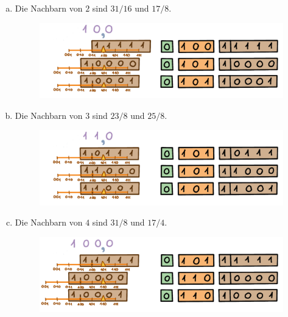 \begin{enumerate}[(a)]
\item Die Nachbarn von \(2\) sind \(31/16\) und \(17/8\).
\begin{figure}[H]
\centering
\includegraphics[width=\linewidth]{Pictures/Nachbarn2.png}
\end{figure}

\item Die Nachbarn von \(3\) sind \(23/8\) und \(25/8\).
\begin{figure}[H]
\centering
\includegraphics[width=\linewidth]{Pictures/Nachbarn3.png}
\end{figure}

\item Die Nachbarn von \(4\) sind \(31/8\) und \(17/4\).
\begin{figure}[H]
\centering
\includegraphics[width=\linewidth]{Pictures/Nachbarn4.png}
\end{figure}

\end{enumerate}


